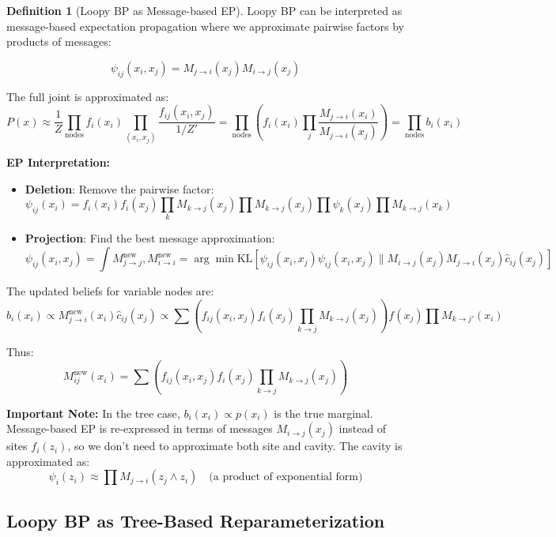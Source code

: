 \documentclass[12pt,a4paper]{article}
\theoremstyle{definition}
\newtheorem{definition}{Definition}[section]
\begin{document}
\begin{definition}[Loopy BP as Message-based EP]
Loopy BP can be interpreted as message-based expectation propagation where we approximate pairwise factors by products of messages:

\[
\psi_{ij}(x_i, x_j) = M_{j \to i}(x_j) M_{i \to j}(x_j)
\]

The full joint is approximated as:
\[
P(x) \approx \frac{1}{Z} \prod_{\text{nodes}} f_i(x_i) \prod_{(x_i, x_j)} \frac{f_{ij}(x_i, x_j)}{1/Z'} = \prod_{\text{nodes}} \left( f_i(x_i) \prod_j \frac{M_{j \to i}(x_i)}{M_{j \to i}(x_j)} \right) = \prod_{\text{nodes}} b_i(x_i)
\]

\textbf{EP Interpretation:}
\begin{itemize}
    \item \textbf{Deletion}: Remove the pairwise factor:
    \[
    \psi_{ij}(x_i) = f_i(x_i) f_i(x_j) \prod_k M_{k \to j}(x_j) \prod M_{k \to j}(x_j) \prod \psi_k(x_j) \prod M_{k \to j}(x_k)
    \]
    
    \item \textbf{Projection}: Find the best message approximation:
    \[
    \psi_{ij}(x_i, x_j) = \int M_{j \to j}^{\text{new}}, M_{i \to i}^{\text{new}} = \arg\min \text{KL}[\psi_{ij}(x_i, x_j) \psi_{ij}(x_i, x_j) \| M_{i \to j}(x_j) M_{j \to i}(x_j) \hat{c}_{ij}(x_j)]
    \]
\end{itemize}

The updated beliefs for variable nodes are:
\[
b_i(x_i) \propto M_{j \to i}^{\text{new}}(x_i) \hat{c}_{ij}(x_j) \propto \sum \left( f_{ij}(x_i, x_j) f_i(x_j) \prod_{k \to j} M_{k \to j}(x_j) \right) f(x_j) \prod M_{k \to j'}(x_i)
\]

Thus:
\[
M_{ij}^{\text{new}}(x_i) = \sum \left( f_{ij}(x_i, x_j) f_i(x_j) \prod_{k \to j} M_{k \to j}(x_j) \right)
\]

\textbf{Important Note:} In the tree case, $b_i(x_i) \propto p(x_i)$ is the true marginal. Message-based EP is re-expressed in terms of messages $M_{i \to j}(x_j)$ instead of sites $f_i(z_i)$, so we don't need to approximate both site and cavity. The cavity is approximated as:
\[
\psi_i(z_i) \approx \prod M_{j \to i}(z_j \land z_i) \quad \text{(a product of exponential form)}
\]
\end{definition}

\subsection{Loopy BP as Tree-Based Reparameterization}
\end{document}
